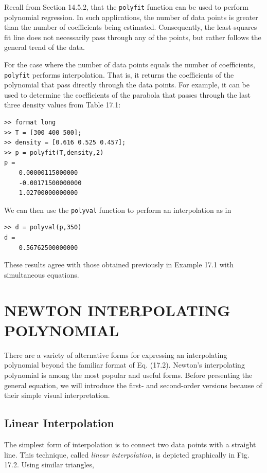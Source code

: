 \documentclass[../main.tex]{subfiles}
\begin{document}
\noindent Recall from Section 14.5.2, that the \texttt{polyfit} function can be used to perform polynomial
regression. In such applications, the number of data points is greater than the number of
coefficients being estimated. Consequently, the least-squares fit line does not necessarily
pass through any of the points, but rather follows the general trend of the data.

For the case where the number of data points equals the number of coefficients, \texttt{polyfit} performs interpolation. That is, it returns the coefficients of the polynomial that pass
directly through the data points. For example, it can be used to determine the coefficients
of the parabola that passes through the last three density values from Table 17.1:

\begin{lstlisting}[numbers=none]
>> format long
>> T = [300 400 500];
>> density = [0.616 0.525 0.457];
>> p = polyfit(T,density,2)
p =
	0.00000115000000
	-0.00171500000000
	1.02700000000000
\end{lstlisting}

\noindent We can then use the \texttt{polyval} function to perform an interpolation as in

\begin{lstlisting}[numbers=none]
>> d = polyval(p,350)
d =
	0.56762500000000
\end{lstlisting}

\noindent These results agree with those obtained previously in Example 17.1 with simultaneous equations.

\label{cha:cha_P_17_2}
\section{NEWTON INTERPOLATING POLYNOMIAL}

\noindent There are a variety of alternative forms for expressing an interpolating polynomial beyond
the familiar format of Eq. (17.2). Newton's interpolating polynomial is among the most
popular and useful forms. Before presenting the general equation, we will introduce the
first- and second-order versions because of their simple visual interpretation.

\label{cha:cha_P_17_2_1}
\subsection{Linear Interpolation}

\noindent The simplest form of interpolation is to connect two data points with a straight line. This
technique, called \textit{linear interpolation}, is depicted graphically in Fig. 17.2. Using similar
triangles,
\end{document}
